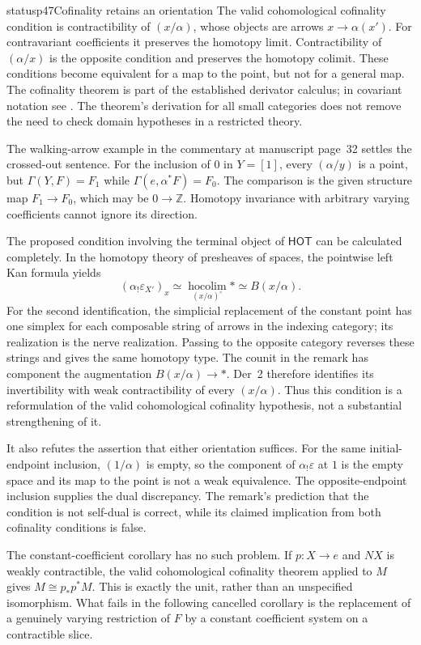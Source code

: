 \begin{dcomment}{status}{p47}{Cofinality retains an orientation}
The valid cohomological cofinality condition is contractibility of
$(x/\alpha)$, whose objects are arrows $x\to\alpha(x')$.
For contravariant coefficients it preserves the homotopy limit.
Contractibility of $(\alpha/x)$ is the opposite condition and
preserves the homotopy colimit. These conditions become equivalent for
a map to the point, but not for a general map. The cofinality theorem
is part of the established derivator calculus; in covariant notation
see \citet[Corollary~3.13 and Remark~3.14]{GrothPontoShulman2014}.
The theorem's derivation for all small categories does not remove the
need to check domain hypotheses in a restricted theory.

The walking-arrow example in the commentary at manuscript page~32
settles the crossed-out sentence. For the inclusion of $0$ in
$Y=[1]$, every $(\alpha/y)$ is a point, but
$\Gamma(Y,F)=F_1$ while $\Gamma(e,\alpha^*F)=F_0$.
The comparison is the given structure map $F_1\to F_0$, which may be
$0\to\mathbb Z$. Homotopy invariance with arbitrary varying
coefficients cannot ignore its direction.

The proposed condition involving the terminal object of $\mathsf{HOT}$
can be calculated completely. In the homotopy theory of presheaves of
spaces, the pointwise left Kan formula yields
\[
 (\alpha_!\varepsilon_{X'})_x
 \simeq\operatorname*{hocolim}_{(x/\alpha)^{\circ}}*
 \simeq B(x/\alpha).
\]
For the second identification, the simplicial replacement of the
constant point has one simplex for each composable string of arrows
in the indexing category; its realization is the nerve realization.
Passing to the opposite category reverses these strings and gives the
same homotopy type. The counit in the remark has component the
augmentation $B(x/\alpha)\to *$. Der~2 therefore identifies its
invertibility with weak contractibility of every $(x/\alpha)$.
Thus this condition is a reformulation of the valid cohomological
cofinality hypothesis, not a substantial strengthening of it.

It also refutes the assertion that either orientation suffices. For
the same initial-endpoint inclusion, $(1/\alpha)$ is empty, so the
component of $\alpha_!\varepsilon$ at $1$ is the empty space and its
map to the point is not a weak equivalence. The opposite-endpoint
inclusion supplies the dual discrepancy. The remark's prediction
that the condition is not self-dual is correct, while its claimed
implication from both cofinality conditions is false.

The constant-coefficient corollary has no such problem. If
$p:X\to e$ and $NX$ is weakly contractible, the valid cohomological
cofinality theorem applied to $M$ gives
$M\cong p_*p^*M$. This is exactly the unit, rather than an
unspecified isomorphism. What fails in the following cancelled
corollary is the replacement of a genuinely varying restriction of
$F$ by a constant coefficient system on a contractible slice.
\end{dcomment}


